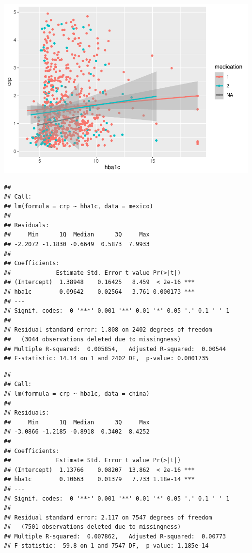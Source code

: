 \documentclass[
  man,floatsintext]{apa6}
\begin{document}
\includegraphics{Final_Groupof5_files/figure-latex/unnamed-chunk-6-1.pdf}

\begin{verbatim}
## 
## Call:
## lm(formula = crp ~ hba1c, data = mexico)
## 
## Residuals:
##     Min      1Q  Median      3Q     Max 
## -2.2072 -1.1830 -0.6649  0.5873  7.9933 
## 
## Coefficients:
##             Estimate Std. Error t value Pr(>|t|)    
## (Intercept)  1.38948    0.16425   8.459  < 2e-16 ***
## hba1c        0.09642    0.02564   3.761 0.000173 ***
## ---
## Signif. codes:  0 '***' 0.001 '**' 0.01 '*' 0.05 '.' 0.1 ' ' 1
## 
## Residual standard error: 1.808 on 2402 degrees of freedom
##   (3044 observations deleted due to missingness)
## Multiple R-squared:  0.005854,   Adjusted R-squared:  0.00544 
## F-statistic: 14.14 on 1 and 2402 DF,  p-value: 0.0001735
\end{verbatim}

\begin{verbatim}
## 
## Call:
## lm(formula = crp ~ hba1c, data = china)
## 
## Residuals:
##     Min      1Q  Median      3Q     Max 
## -3.0866 -1.2185 -0.8918  0.3402  8.4252 
## 
## Coefficients:
##             Estimate Std. Error t value Pr(>|t|)    
## (Intercept)  1.13766    0.08207  13.862  < 2e-16 ***
## hba1c        0.10663    0.01379   7.733 1.18e-14 ***
## ---
## Signif. codes:  0 '***' 0.001 '**' 0.01 '*' 0.05 '.' 0.1 ' ' 1
## 
## Residual standard error: 2.117 on 7547 degrees of freedom
##   (7501 observations deleted due to missingness)
## Multiple R-squared:  0.007862,   Adjusted R-squared:  0.00773 
## F-statistic:  59.8 on 1 and 7547 DF,  p-value: 1.185e-14
\end{verbatim}
\end{document}
